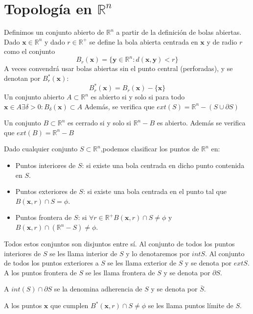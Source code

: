 \documentclass{../Calculo.tex}
\begin{document}
\section{Topología en $\mathbb{R}^{n}$}
\begin{defin}

Definimos un conjunto abierto de $\mathbb{R}^n$ a partir de la definición de bolas abiertas.\\
Dado $\mathbf{x}\in \mathbb{R}^n$ y dado $r\in \mathbb{R}^+$ se define la bola abierta centrada en $\mathbf{x}$ y de radio $r$ como el conjunto
$$
B_{r}(\mathbf{x})=\{ \mathbf{y}\in \mathbb{R}^n: d(\mathbf{x},\mathbf{y}) < r \}
$$
A veces convendrá usar bolas abiertas sin el punto central (perforadas), y se denotan por $B_{r}^*(\mathbf{x})$:
$$
B_{r}^*(\mathbf{x})=B_{r}(\mathbf{x})- \{ \mathbf{x} \}
$$
Un conjunto abierto $A\subset \mathbb{R}^n$ es abierto si y solo si para todo $\mathbf{x}\in A \exists \delta >0 : B_{\delta}(\mathbf{x})\subset A$
Además, se verifica que $ext(S)=\mathbb{R}^{n}-(S\cup\partial S)$
\end{defin}
\begin{defin}
Un conjunto $B\subset \mathbb{R}^n$ es cerrado si y solo si
$\mathbb{R}^n-B$ es abierto.
Además se verifica que $ext(B)=\mathbb{R}^{n}-B$
\end{defin}
Dado cualquier conjunto $S\subset \mathbb{R}^n$,podemos clasificar los puntos de $\mathbb{R}^n$ en:
\begin{itemize}
	\item Puntos interiores de $S$: si existe una bola centrada en dicho punto contenida en $S$.
	\item Puntos exteriores de $S$: si existe una bola centrada en el punto tal que $B(\mathbf{x},r) \cap S = \phi$.
	\item Puntos frontera de $S$: si $\forall r\in \mathbb{R}^{+} B(\mathbf{x},r)\cap S \neq \phi$ y $B(\mathbf{x},r)\cap(\mathbb{R}^n-S)\neq \phi$.
\end{itemize}
Todos estos conjuntos son disjuntos entre sí. Al conjunto de todos los puntos interiores de $S$ se les llama interior de $S$ y lo denotaremos por $int S$. Al conjunto de todos los puntos exteriores a $S$ se les llama exterior de $S$ y se denota por $ext S$. A los puntos frontera de $S$ se les llama frontera de $S$ y se denota por $\partial S$.
\begin{defin}
A $int(S)\cap\partial S$ se la denomina adherencia de $S$ y se denota por $\bar{S}$.
\end{defin}
\begin{defin}
A los puntos $\mathbf{x}$ que cumplen $B^{*}(\mathbf{x},r)\cap S\neq \phi$ se les llama puntos límite de $S$.
\end{defin}
\end{document}
